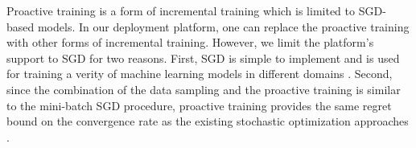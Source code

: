 Proactive training is a form of incremental training \cite{gepperth2016incremental} which is limited to SGD-based models.
In our deployment platform, one can replace the proactive training with other forms of incremental training.
However, we limit the platform's support to SGD for two reasons.
First, SGD is simple to implement and is used for training a verity of machine learning models in different domains \cite{ macmahan2013, bottou1995convergence, koren2009matrix}. 
Second, since the combination of the data sampling and the proactive training is similar to the mini-batch SGD procedure, proactive training provides the same regret bound on the convergence rate as the existing stochastic optimization approaches \cite{zhang2004solving, kingma2014adam}.

%
%
